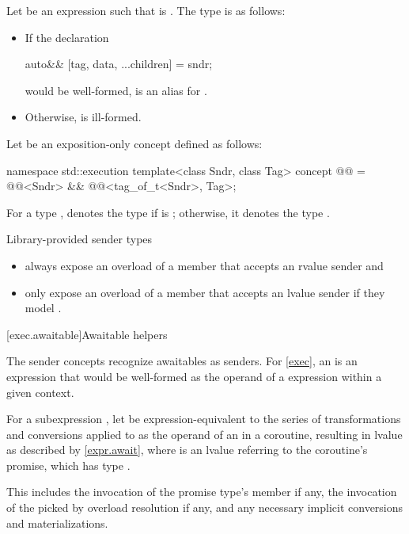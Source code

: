 \pnum
Let  be an expression
such that  is .
The type  is as follows:
\begin{itemize}
\item
If the declaration
\begin{codeblock}
auto&& [tag, data, ...children] = sndr;
\end{codeblock}
would be well-formed,  is
an alias for .
\item
Otherwise,  is ill-formed.
\end{itemize}

\pnum
Let  be an exposition-only concept defined as follows:
\begin{codeblock}
namespace std::execution {
  template<class Sndr, class Tag>
  concept @@ =
    @@<Sndr> &&
    @@<tag_of_t<Sndr>, Tag>;
}
\end{codeblock}

\pnum
For a type ,
 denotes the type 
if  is \cv{} ;
otherwise, it denotes the type .

\pnum
Library-provided sender types
\begin{itemize}
\item
always expose an overload of a member 
that accepts an rvalue sender and
\item
only expose an overload of a member 
that accepts an lvalue sender if they model .
\end{itemize}

[exec.awaitable]{Awaitable helpers}

\pnum
The sender concepts recognize awaitables as senders.
For \ref{exec}, an  is an expression
that would be well-formed as the operand of a  expression
within a given context.

\pnum
For a subexpression ,
let  be expression-equivalent to
the series of transformations and conversions applied to 
as the operand of an  in a coroutine,
resulting in lvalue  as described by \ref{expr.await},
where  is an lvalue referring to the coroutine's promise,
which has type .
\begin{note}
This includes the invocation of
the promise type's  member if any,
the invocation of the 
picked by overload resolution if any, and
any necessary implicit conversions and materializations.
\end{note}

